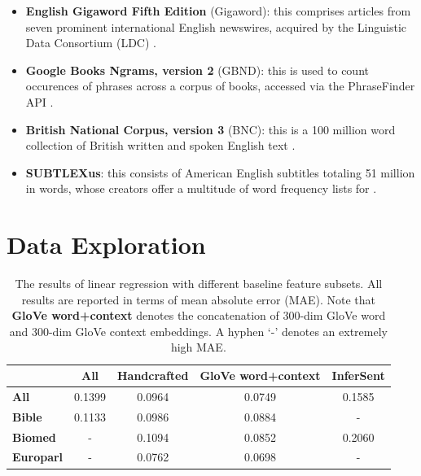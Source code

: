 \documentclass{dcthesis}
\theoremstyle{definition}
\theoremstyle{remark}
\begin{document}
\begin{itemize}
  \item \textbf{English Gigaword Fifth Edition} (Gigaword): this comprises articles from seven prominent international English newswires, acquired by the Linguistic Data Consortium (LDC) \citep{parker2011english}.
  \item \textbf{Google Books Ngrams, version 2} (GBND): this is used to count occurences of phrases across a corpus of books, accessed via the PhraseFinder API \citep{phrasefinder}.
  \item \textbf{British National Corpus, version 3} (BNC): this is a 100 million word collection of British written and spoken English text \citep{bnc2007british}.
  \item \textbf{SUBTLEXus}: this consists of American English subtitles totaling 51 million in words, whose creators offer a multitude of word frequency lists for \citep{brysbaert2009moving}.
\end{itemize}

\chapter{Data Exploration}

\begin{table}
    \centering
    \begin{tabular}{l|c|c|c|c}
    \hline
     & \textbf{All} & \textbf{Handcrafted} & \textbf{GloVe word+context} & \textbf{InferSent} \\
    \hline
    \textbf{All} & 0.1399 & 0.0964 & 0.0749 & 0.1585 \\
    \textbf{Bible} & 0.1133 & 0.0986 & 0.0884 & - \\
    \textbf{Biomed} & - & 0.1094 & 0.0852 & 0.2060 \\
    \textbf{Europarl} & - & 0.0762 & 0.0698 & - \\
    \hline
    \end{tabular}
    \caption{\label{tab:baseline_models} The results of linear regression with different baseline feature subsets. All results are reported in terms of mean absolute error (MAE). Note that \textbf{GloVe word+context} denotes the concatenation of 300-dim GloVe word and 300-dim GloVe context embeddings. A hyphen `-' denotes an extremely high MAE.}
\end{table}
\end{document}
